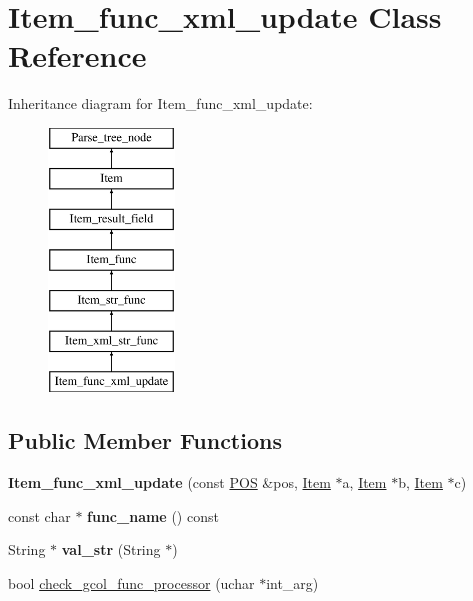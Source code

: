 \hypertarget{classItem__func__xml__update}{}\section{Item\+\_\+func\+\_\+xml\+\_\+update Class Reference}
\label{classItem__func__xml__update}
Inheritance diagram for Item\+\_\+func\+\_\+xml\+\_\+update\+:\begin{figure}[H]
\begin{center}
\leavevmode
\includegraphics[height=7.000000cm]{classItem__func__xml__update}
\end{center}
\end{figure}
\subsection*{Public Member Functions}
\begin{DoxyCompactItemize}
\item 
\mbox{\label{classItem__func__xml__update_a644835a841b409c62d2e5b3c2882212d}} 
{\bfseries Item\+\_\+func\+\_\+xml\+\_\+update} (const \mbox{\hyperlink{structYYLTYPE}{P\+OS}} \&pos, \mbox{\hyperlink{classItem}{Item}} $\ast$a, \mbox{\hyperlink{classItem}{Item}} $\ast$b, \mbox{\hyperlink{classItem}{Item}} $\ast$c)
\item 
\mbox{\label{classItem__func__xml__update_a886c84288b65a718ab0cf7debdb0aa22}} 
const char $\ast$ {\bfseries func\+\_\+name} () const
\item 
\mbox{\label{classItem__func__xml__update_a7e72ce8975dd273c203b5e101a590419}} 
String $\ast$ {\bfseries val\+\_\+str} (String $\ast$)
\item 
bool \mbox{\hyperlink{classItem__func__xml__update_aef4d74587e25de0b32a863ecc3b27214}{check\+\_\+gcol\+\_\+func\+\_\+processor}} (uchar $\ast$int\+\_\+arg)
\end{DoxyCompactItemize}
